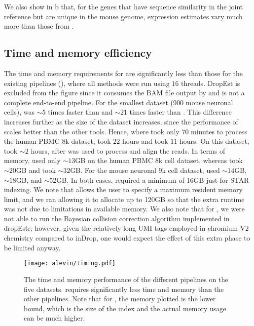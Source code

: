 We also show in b that, for the genes that have
  sequence similarity in the joint reference but are unique in the mouse genome,
  \cellr expression estimates vary much more than those from \alevin.

\subsection{Time and memory efficiency}
The time and memory requirements for \alevin are significantly less than those for the existing pipelines (), where all methods were run using $16$ threads. DropEst is excluded from the figure since it consumes the BAM file output by \cellr and is not a complete end-to-end pipeline. For the smallest dataset (900 mouse neuronal cells), \alevin was $\sim5$ times faster than \naive and $\sim21$ times faster than \cellr. This difference increases further as the size of the dataset increases, since the performance of \alevin scales better than the other tools. Hence, where \alevin took only $70$ minutes to process the human PBMC 8k dataset, \cellr took $22$ hours and \naive took $11$ hours. On this dataset, \dropest took $\sim2$ hours, after \cellr was used to process and align the reads. In terms of memory, \alevin used only $\sim13$GB on the human PBMC 8k cell dataset, whereas \naive took $\sim20$GB and \dropest took $\sim32$GB. For the mouse neuronal 9k cell dataset, \alevin used $\sim14$GB, \naive  $\sim18$GB, and \dropest $\sim52$GB. In both cases, \cellr required a minimum of 16GB just for STAR indexing. We note that \cellr allows the user to specify a maximum resident memory limit, and we ran \cellr allowing it to allocate up to 120GB so that the extra runtime was not due to limitations in available memory. We also note that for \dropest, we were not able to run the Bayesian collision correction algorithm implemented in dropEstr; however, given the relatively long UMI tags employed in chromium V2 chemistry compared to inDrop, one would expect the effect of this extra phase to be limited anyway.

\begin{figure*}[!htb]
    \centering
  \texttt{[image: alevin/timing.pdf]}
  \caption{The time and memory performance of the different pipelines on the five datasets. \Alevin requires significantly less time and memory than the other pipelines. Note that for \cellr, the memory plotted is the lower bound, which is the size of the index and the actual memory usage can be much higher.} %
  \label{fig:timemem}
\end{figure*}


